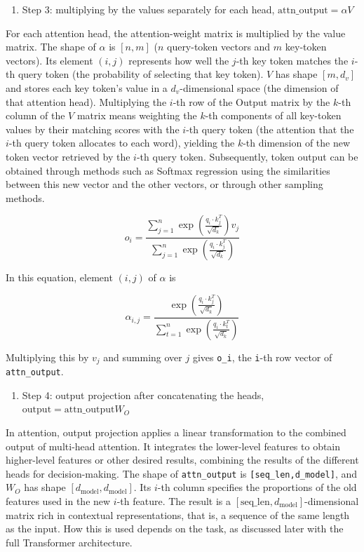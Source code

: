 \begin{enumerate}
\def\labelenumi{\arabic{enumi}.}
\setcounter{enumi}{2}
\tightlist
\item
  Step 3: multiplying by the values separately for each head, \(\mathrm{attn\_output}=\alpha V\)
\end{enumerate}

For each attention head, the attention-weight matrix is multiplied by the value matrix. The shape of \(\alpha\) is \([n,m]\) (\(n\) query-token vectors and \(m\) key-token vectors). Its element \((i,j)\) represents how well the \(j\)-th key token matches the \(i\)-th query token (the probability of selecting that key token). \(V\) has shape \([m,d_v]\) and stores each key token's value in a \(d_v\)-dimensional space (the dimension of that attention head). Multiplying the \(i\)-th row of the Output matrix by the \(k\)-th column of the \(V\) matrix means weighting the \(k\)-th components of all key-token values by their matching scores with the \(i\)-th query token (the attention that the \(i\)-th query token allocates to each word), yielding the \(k\)-th dimension of the new token vector retrieved by the \(i\)-th query token. Subsequently, token output can be obtained through methods such as Softmax regression using the similarities between this new vector and the other vectors, or through other sampling methods.

\[
o_i = \frac{\sum_{j=1}^{n} \exp\left(\frac{q_i \cdot k_j^T}{\sqrt{d_k}}\right) v_j}{\sum_{j=1}^{n} \exp\left(\frac{q_i \cdot k_j^T}{\sqrt{d_k}}\right)}
\]

In this equation, element \((i,j)\) of \(\alpha\) is

\[
\alpha_{i,j} = \frac{\exp\left(\frac{q_i \cdot k_j^T}{\sqrt{d_k}}\right)}{\sum_{t=1}^{n} \exp\left(\frac{q_i \cdot k_t^T}{\sqrt{d_k}}\right)}
\]

Multiplying this by \(v_j\) and summing over \(j\) gives \texttt{o\_i}, the \texttt{i}-th row vector of \texttt{attn\_output}.

\begin{enumerate}
\def\labelenumi{\arabic{enumi}.}
\setcounter{enumi}{3}
\tightlist
\item
  Step 4: output projection after concatenating the heads, \(\mathrm{output}=\mathrm{attn\_output}W_O\)
\end{enumerate}

In attention, output projection applies a linear transformation to the combined output of multi-head attention. It integrates the lower-level features to obtain higher-level features or other desired results, combining the results of the different heads for decision-making. The shape of \texttt{attn\_output} is \texttt{{[}seq\_len,d\_model{]}}, and \(W_O\) has shape \([d_{\mathrm{model}},d_{\mathrm{model}}]\). Its \(i\)-th column specifies the proportions of the old features used in the new \(i\)-th feature. The result is a \([\mathrm{seq\_len},d_{\mathrm{model}}]\)-dimensional matrix rich in contextual representations, that is, a sequence of the same length as the input. How this is used depends on the task, as discussed later with the full Transformer architecture.

